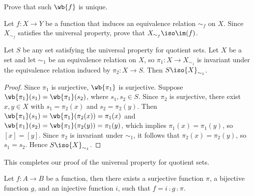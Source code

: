 \documentclass[10pt]{article}
\begin{document}
\begin{problem}
    Prove that such $\wb{f}$ is unique.
\end{problem}
\begin{problem}
    Let $f:X\to Y$ be a function that induces an equivalence relation ${\sim_{f}}$ on $X$. Since ${X}_{{\sim}_{f}}$ satisfies the universal property, prove that ${X}_{{\sim}_{f}}\iso\im(f)$.
\end{problem}
\begin{proposition}
    Let $S$ be any set satisfying the universal property for quotient sets. Let $X$ be a set and let ${\sim}_{1}$ be an equivalence relation on $X$, so ${\pi}_{1}:X\to{X}_{{\sim}_{1}}$ is invariant under the equivalence relation induced by ${\pi}_{2}:X\to S$. Then $S\iso{X}_{{\sim}_{1}}$.
\end{proposition}
\begin{center}
\end{center}
\begin{proof}
    Since ${\pi}_{1}$ is surjective, $\wb{{\pi}_{1}}$ is surjective. Suppose $\wb{{\pi}_{1}}({s}_{1})=\wb{{\pi}_{1}}({s}_{2})$, where ${s}_{1}, {s}_{2}\in S$. Since $\pi_2$ is surjective, there exist $x,y\in X$ with ${s}_{1}={\pi}_{2}(x)$ and ${s}_{2}={\pi}_{2}(y)$. Then $\wb{{\pi}_{1}}({s}_{1})=\wb{{\pi}_{1}}({\pi}_{2}(x))={\pi}_{1}(x)$ and $\wb{{\pi}_{1}}({s}_{2})=\wb{{\pi}_{1}}({\pi}_{2}(y))={\pi}_{1}(y)$, which implies ${\pi}_{1}(x)={\pi}_{1}(y)$, so $[x]=[y]$. Since ${\pi}_{2}$ is invariant under ${\sim}_{1}$, it follows that ${\pi}_{2}(x)={\pi}_{2}(y)$, so ${s}_{1}={s}_{2}$. Hence $S\iso{X}_{{\sim}_{1}}$.        
\end{proof}
\par
This completes our proof of the universal property for quotient sets.
\begin{theorem}
    Let $f:A\to B$ be a function, then there exists a surjective function $\pi$, a bijective function $g$, and an injective function $i$, such that $f=i\comp g\comp\pi$.
\end{theorem}
\begin{center}
\end{center}
\end{document}
